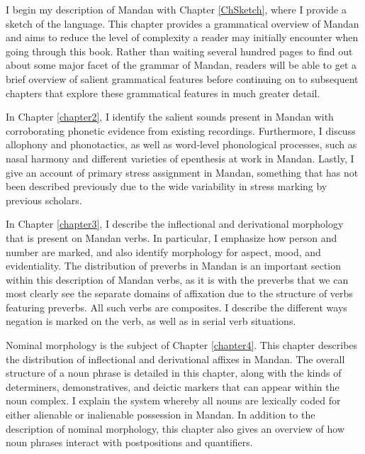 I begin my description of Mandan with Chapter \ref{ChSketch}, where I provide a sketch of the language. This chapter provides a grammatical overview of Mandan and aims to reduce the level of complexity a reader may initially encounter when going through this book. Rather than waiting several hundred pages to find out about some major facet of the grammar of Mandan, readers will be able to get a brief overview of salient grammatical features before continuing on to subsequent chapters that explore these grammatical features in much greater detail.

In Chapter \ref{chapter2}, I identify the salient sounds present in Mandan with corroborating phonetic evidence from existing recordings. Furthermore, I discuss allophony and phonotactics, as well as word-level phonological processes, such as nasal harmony and different varieties of epenthesis at work in Mandan. Lastly, I give an account of primary stress assignment in Mandan, something that has not been described previously due to the wide variability in stress marking by previous scholars.

In Chapter \ref{chapter3}, I describe the inflectional and derivational morphology that is present on Mandan verbs. In particular, I emphasize how person and number are marked, and also identify morphology for aspect, mood, and evidentiality. The distribution of preverbs in Mandan is an important section within this description of Mandan verbs, as it is with the preverbs that we can most clearly see the separate domains of affixation due to the structure of verbs featuring preverbs. All such verbs are composites. I describe the different ways negation is marked on the verb, as well as in serial verb situations.

Nominal morphology is the subject of Chapter \ref{chapter4}. This chapter describes the distribution of inflectional and derivational affixes in Mandan. The overall structure of a noun phrase is detailed in this chapter, along with the kinds of determiners, demonstratives, and deictic markers that can appear within the noun complex. I explain the system whereby all nouns are lexically coded for either alienable or inalienable possession in Mandan. In addition to the description of nominal morphology, this chapter also gives an overview of how noun phrases interact with postpositions and quantifiers.

